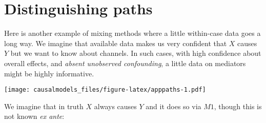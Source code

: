 \documentclass[
  12pt,
]{book}
\newenvironment{Shaded}{\begin{snugshade}}{\end{snugshade}}
\newcommand{\DataTypeTok}[1]{\textcolor[rgb]{0.13,0.29,0.53}{#1}}
\newcommand{\DecValTok}[1]{\textcolor[rgb]{0.00,0.00,0.81}{#1}}
\newcommand{\KeywordTok}[1]{\textcolor[rgb]{0.13,0.29,0.53}{\textbf{#1}}}
\newcommand{\NormalTok}[1]{#1}
\newcommand{\OperatorTok}[1]{\textcolor[rgb]{0.81,0.36,0.00}{\textbf{#1}}}
\newcommand{\OtherTok}[1]{\textcolor[rgb]{0.56,0.35,0.01}{#1}}
\newcommand{\StringTok}[1]{\textcolor[rgb]{0.31,0.60,0.02}{#1}}
\begin{document}
\hypertarget{distinguishing-paths}{%
\section{Distinguishing paths}\label{distinguishing-paths}}

Here is another example of mixing methods where a little within-case data goes a long way. We imagine that available data makes us very confident that \(X\) causes \(Y\) but we want to know about channels. In such cases, with high confidence about overall effects, and \emph{absent unobserved confounding}, a little data on mediators might be highly informative.

\begin{Shaded}
\end{Shaded}

\texttt{[image: causalmodels\_files/figure-latex/apppaths-1.pdf]}

We imagine that in truth \(X\) always causes \(Y\) and it does so via \(M1\), though this is not known \emph{ex ante}:
\end{document}
